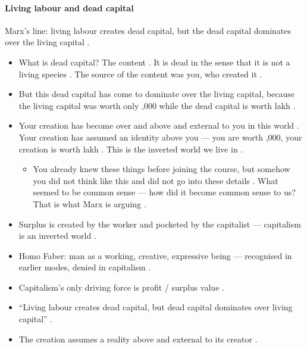 \paragraph{Living labour and dead capital}
\begin{KeyConcept}
Marx's line: living labour creates dead capital, but the dead capital dominates over the living capital .
\end{KeyConcept}

\begin{itemize}
    \item What is dead capital? The content . It is dead in the sense that it is not a living species . The source of the content was you, who created it .
    \item But this dead capital has come to dominate over the living capital, because the living capital was worth only ,000 while the dead capital is worth  lakh .
    \item Your creation has become over and above and external to you in this world . Your creation has assumed an identity above you --- you are worth ,000, your creation is worth  lakh . This is the inverted world we live in .
    \begin{itemize}
        \item You already knew these things before joining the course, but somehow you did not think like this and did not go into these details . What seemed to be common sense --- how did it become common sense to us? That is what Marx is arguing .
    \end{itemize}
\end{itemize}

\begin{QuickRevision}
\begin{itemize}
    \item Surplus is created by the worker and pocketed by the capitalist --- capitalism is an inverted world .
    \item Homo Faber: man as a working, creative, expressive being --- recognised in earlier modes, denied in capitalism .
    \item Capitalism's only driving force is profit / surplus value .
    \item ``Living labour creates dead capital, but dead capital dominates over living capital'' .
    \item The creation assumes a reality above and external to its creator .
\end{itemize}
\end{QuickRevision}

